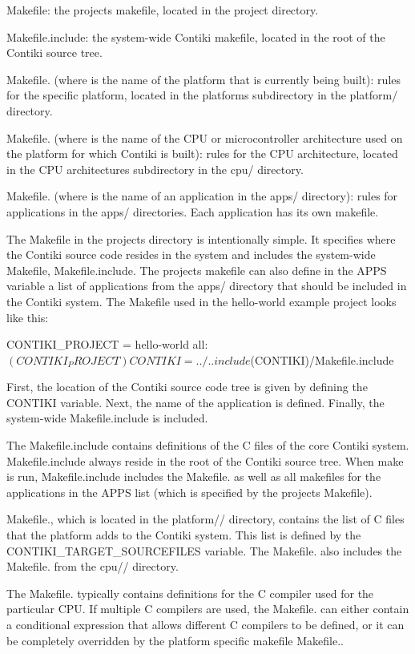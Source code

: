 \begin{DoxyItemize}
\item Makefile\+: the project\textquotesingle{}s makefile, located in the project directory.
\item Makefile.\+include\+: the system-\/wide Contiki makefile, located in the root of the Contiki source tree.
\item Makefile. (where  is the name of the platform that is currently being built)\+: rules for the specific platform, located in the platform\textquotesingle{}s subdirectory in the platform/ directory.
\item Makefile. (where  is the name of the C\+P\+U or microcontroller architecture used on the platform for which Contiki is built)\+: rules for the C\+P\+U architecture, located in the C\+P\+U architecture\textquotesingle{}s subdirectory in the cpu/ directory.
\item Makefile. (where  is the name of an application in the apps/ directory)\+: rules for applications in the apps/ directories. Each application has its own makefile.
\end{DoxyItemize}

The Makefile in the project\textquotesingle{}s directory is intentionally simple. It specifies where the Contiki source code resides in the system and includes the system-\/wide Makefile, Makefile.\+include. The project\textquotesingle{}s makefile can also define in the A\+P\+P\+S variable a list of applications from the apps/ directory that should be included in the Contiki system. The Makefile used in the hello-\/world example project looks like this\+: \begin{DoxyVerb}CONTIKI_PROJECT = hello-world
all: $(CONTIKI_PROJECT)

CONTIKI = ../..
include $(CONTIKI)/Makefile.include
\end{DoxyVerb}


First, the location of the Contiki source code tree is given by defining the C\+O\+N\+T\+I\+K\+I variable. Next, the name of the application is defined. Finally, the system-\/wide Makefile.\+include is included.

The Makefile.\+include contains definitions of the C files of the core Contiki system. Makefile.\+include always reside in the root of the Contiki source tree. When make is run, Makefile.\+include includes the Makefile. as well as all makefiles for the applications in the A\+P\+P\+S list (which is specified by the project\textquotesingle{}s Makefile).

Makefile., which is located in the platform// directory, contains the list of C files that the platform adds to the Contiki system. This list is defined by the C\+O\+N\+T\+I\+K\+I\+\_\+\+T\+A\+R\+G\+E\+T\+\_\+\+S\+O\+U\+R\+C\+E\+F\+I\+L\+E\+S variable. The Makefile. also includes the Makefile. from the cpu// directory.

The Makefile. typically contains definitions for the C compiler used for the particular C\+P\+U. If multiple C compilers are used, the Makefile. can either contain a conditional expression that allows different C compilers to be defined, or it can be completely overridden by the platform specific makefile Makefile.. 